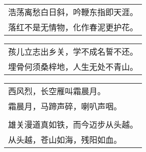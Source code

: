 \nopagebreak%
\nopagebreak%
\noindent\begin{minipage}{\linewidth}
  \vskip-3pt\begin{table}[H]
    \centering
    \begin{tabular}{@{}l@{}}
浩荡离愁白日斜，吟鞭东指即天涯。\\
落红不是无情物，化作春泥更护花。
    \end{tabular}
  \end{table}
\end{minipage}
\vspace{1cm}


\nopagebreak%
\nopagebreak%
\noindent\begin{minipage}{\linewidth}
  \vskip-3pt\begin{table}[H]
    \centering
    \begin{tabular}{@{}l@{}}
孩儿立志出乡关，学不成名誓不还。\\
埋骨何须桑梓地，人生无处不青山。
    \end{tabular}
  \end{table}
\end{minipage}
\vspace{1cm}


\nopagebreak%
\nopagebreak%
\noindent\begin{minipage}{\linewidth}
  \vskip-3pt\begin{table}[H]
    \centering
    \begin{tabular}{@{}l@{}}
西风烈，长空雁叫霜晨月。\\
霜晨月，马蹄声碎，喇叭声咽。\\
\\
雄关漫道真如铁，而今迈步从头越。\\
从头越，苍山如海，残阳如血。
    \end{tabular}
  \end{table}
\end{minipage}
\vspace{1cm}


